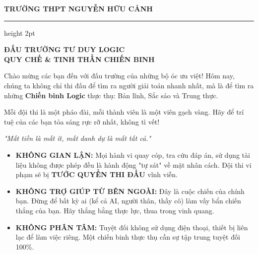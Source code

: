 \documentclass[12pt, a4paper]{article}
\begin{document}
\begin{center}
    \textbf{\large TRƯỜNG THPT NGUYỄN HỮU CẢNH} \\
    \vspace{0.2cm}
    {\color{schoolblue} \hrule height 2pt}
    \vspace{0.5cm}
    
    {\huge \textbf{\color{schoolblue} ĐẤU TRƯỜNG TƯ DUY LOGIC}} \\
    \vspace{0.3cm}
    {\large \textbf{QUY CHẾ \& TINH THẦN CHIẾN BINH}}
\end{center}
\vspace{0.5cm}

\begin{tcolorbox}[colback=blue!5!white, colframe=schoolblue, title=\textbf{\large \ding{45} KHÚC KHẢI HOÀN CỦA TRÍ TUỆ}]
    Chào mừng các bạn đến với đấu trường của những bộ óc ưu việt! Hôm nay, chúng ta không chỉ thi đấu để tìm ra người giải toán nhanh nhất, mà là để tìm ra những \textbf{Chiến binh Logic} thực thụ: Bản lĩnh, Sắc sảo và Trung thực.
    
    Mỗi đội thi là một pháo đài, mỗi thành viên là một viên gạch vàng. Hãy để trí tuệ của các bạn tỏa sáng rực rỡ nhất, không tì vết!
\end{tcolorbox}

\vspace{0.5cm}

\begin{tcolorbox}[colback=white, colframe=alertred, title=\textbf{\large \ding{56} LỜI THỀ DANH DỰ (TUYỆT ĐỐI KHÔNG VI PHẠM)}]
    \textit{"Mất tiền là mất ít, mất danh dự là mất tất cả."}
    \begin{itemize}[label=\color{alertred}, leftmargin=*]
        \item \textbf{KHÔNG GIAN LẬN:} Mọi hành vi quay cóp, tra cứu đáp án, sử dụng tài liệu không được phép đều là hành động "tự sát" về mặt nhân cách. Đội thi vi phạm sẽ bị \textbf{TƯỚC QUYỀN THI ĐẤU} vĩnh viễn.
        \item \textbf{KHÔNG TRỢ GIÚP TỪ BÊN NGOÀI:} Đây là cuộc chiến của chính bạn. Đừng để bất kỳ ai (kể cả AI, người thân, thầy cô) làm vấy bẩn chiến thắng của bạn. Hãy thắng bằng thực lực, thua trong vinh quang.
        \item \textbf{KHÔNG PHÂN TÂM:} Tuyệt đối không sử dụng điện thoại, thiết bị liên lạc để làm việc riêng. Một chiến binh thực thụ cần sự tập trung tuyệt đối 100\%.
    \end{itemize}
\end{tcolorbox}
\end{document}
